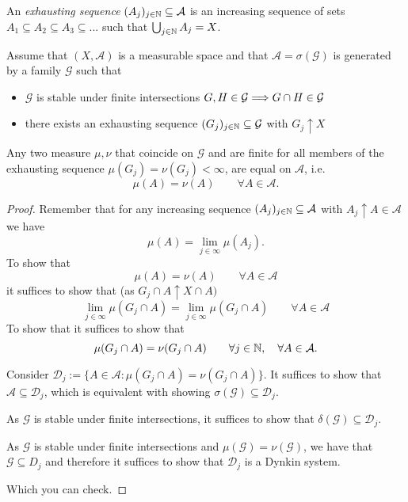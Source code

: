 \begin{defn}
An \emph{exhausting sequence} \((A_{j})_{j\in \Bbb{N}}\subseteq \mathcal{A}\) is an increasing sequence of sets \(A_{1}\subseteq A_{2}\subseteq A_{3}\subseteq ...\) such that \(\bigcup _{j\in \Bbb{N}}A_{j}=X\).
\end{defn}
\newpage
\begin{thm}
Assume that \((X,\mathcal{A})\) is a measurable space and that \(\mathcal{A}=\sigma (\mathcal{G})\) is generated by a family \(\mathcal{G}\) such that

\begin{itemize}
  \item \(\mathcal{G}\) is stable under finite intersections \(G,H\in \mathcal{G}\space \Longrightarrow \space G\cap H\in \mathcal{G}\)
  \item there exists an exhausting sequence \((G_{j})_{j\in \Bbb{N}}\subseteq \mathcal{G}\) with \(G_{j}\uparrow X\)
\end{itemize}

Any two measure \(\mu ,\nu \) that coincide on \(\mathcal{G}\) and are finite for all members of the exhausting sequence \(\mu (G_{j})=\nu (G_{j})<\infty \), are equal on \(\mathcal{A}\), i.e.
\[
\mu (A)=\nu (A) \qquad \forall A\in \mathcal{A}.
\]
\end{thm}

\begin{proof}
Remember that for any increasing sequence \((A_{j})_{j\in \Bbb{N}}\subseteq \mathcal{A}\) with \(A_{j}\uparrow A\in \mathcal{A}\) we have
\[
\mu (A)=\lim_{j\in \infty }\mu (A_{j}).
\]
To show that
\[
\mu (A)=\nu (A) \qquad \forall A\in \mathcal{A}
\]
it suffices to show that (as \(G_{j}\cap A\uparrow X\cap A)\)
\[
\lim_{j\in \infty }\mu (G_{j}\cap A)=\lim_{j\in \infty }\mu (G_{j}\cap A) \qquad \forall A\in \mathcal{A}
\]
To show that it suffices to show that
\[
\mu (G_{j}\cap A)=\nu (G_{j}\cap A) \qquad \forall j\in \Bbb{N}, \quad \forall A\in \mathcal{A}.
\]

Consider \(\mathcal{D}_{j}:=\{A\in \mathcal{A} : \mu (G_{j}\cap A)=\nu (G_{j}\cap A)\}\). It suffices to show that \(\mathcal{A}\subseteq \mathcal{D}_{j}\), which is equivalent with showing \(\sigma (\mathcal{G})\subseteq \mathcal{D}_{j}\).

As \(\mathcal{G}\) is stable under finite intersections, it suffices to show that \(\delta (\mathcal{G})\subseteq \mathcal{D}_{j}.\)

As \(\mathcal{G}\) is stable under finite intersections and \(\mu (\mathcal{G})=\nu (\mathcal{G})\), we have that \(\mathcal{G}\subseteq D_{j}\) and therefore it suffices to show that \(\mathcal{D}_{j}\) is a Dynkin system.

Which you can check.
\end{proof}

